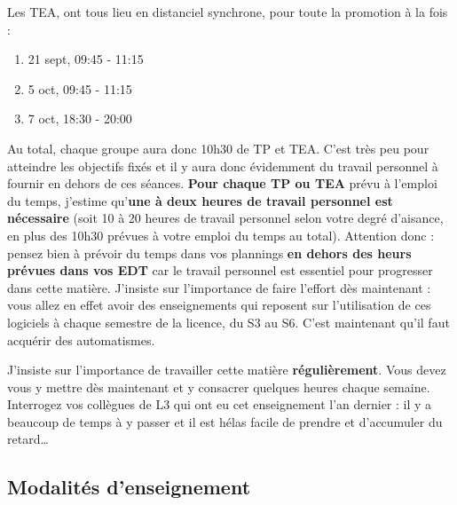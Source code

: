 \documentclass[
  a4paper,
  DIV=11,
  numbers=noendperiod,
  oneside]{scrreprt}
\providecommand{\tightlist}{%
  \setlength{\itemsep}{0pt}\setlength{\parskip}{0pt}}\usepackage{longtable,booktabs,array}
\begin{document}
Les TEA, ont tous lieu en distanciel synchrone, pour toute la promotion
à la fois :

\begin{enumerate}
\def\labelenumi{\arabic{enumi}.}
\tightlist
\item
  21 sept, 09:45 - 11:15
\item
  5 oct, 09:45 - 11:15
\item
  7 oct, 18:30 - 20:00
\end{enumerate}

Au total, chaque groupe aura donc 10h30 de TP et TEA. C'est très peu
pour atteindre les objectifs fixés et il y aura donc évidemment du
travail personnel à fournir en dehors de ces séances. \textbf{Pour
chaque TP ou TEA} prévu à l'emploi du temps, j'estime qu'\textbf{une à
deux heures de travail personnel est nécessaire} (soit 10 à 20 heures de
travail personnel selon votre degré d'aisance, en plus des 10h30 prévues
à votre emploi du temps au total). Attention donc : pensez bien à
prévoir du temps dans vos plannings \textbf{en dehors des heurs prévues
dans vos EDT} car le travail personnel est essentiel pour progresser
dans cette matière. J'insiste sur l'importance de faire l'effort dès
maintenant : vous allez en effet avoir des enseignements qui reposent
sur l'utilisation de ces logiciels à chaque semestre de la licence, du
S3 au S6. C'est maintenant qu'il faut acquérir des automatismes.

\begin{tcolorbox}[enhanced jigsaw, arc=.35mm, opacityback=0, colbacktitle=quarto-callout-warning-color!10!white, bottomrule=.15mm, coltitle=black, colframe=quarto-callout-warning-color-frame, breakable, toprule=.15mm, title=\textcolor{quarto-callout-warning-color}{\faExclamationTriangle}\hspace{0.5em}{Travaillez régulièrement !}, leftrule=.75mm, titlerule=0mm, bottomtitle=1mm, toptitle=1mm, left=2mm, rightrule=.15mm, opacitybacktitle=0.6, colback=white]

J'insiste sur l'importance de travailler cette matière
\textbf{régulièrement}. Vous devez vous y mettre dès maintenant et y
consacrer quelques heures chaque semaine. Interrogez vos collègues de L3
qui ont eu cet enseignement l'an dernier : il y a beaucoup de temps à y
passer et il est hélas facile de prendre et d'accumuler du
retard\ldots{}

\end{tcolorbox}

\subsection*{Modalités d'enseignement}\label{modalituxe9s-denseignement}
\end{document}
